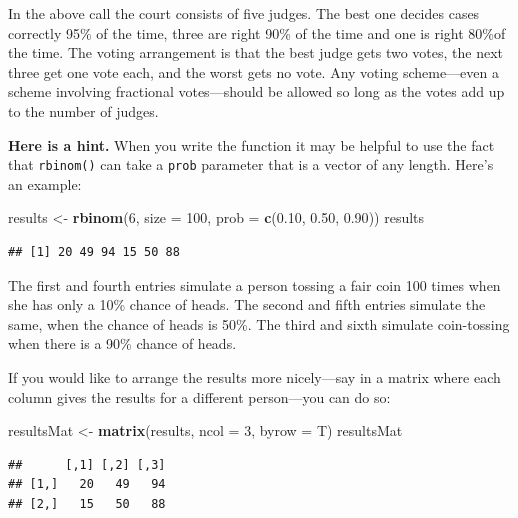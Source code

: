 \documentclass[]{book}
\makeatletter
\newenvironment{Shaded}{\begin{snugshade}}{\end{snugshade}}
\newcommand{\KeywordTok}[1]{\textcolor[rgb]{0.13,0.29,0.53}{\textbf{#1}}}
\newcommand{\DataTypeTok}[1]{\textcolor[rgb]{0.13,0.29,0.53}{#1}}
\newcommand{\DecValTok}[1]{\textcolor[rgb]{0.00,0.00,0.81}{#1}}
\newcommand{\FloatTok}[1]{\textcolor[rgb]{0.00,0.00,0.81}{#1}}
\newcommand{\StringTok}[1]{\textcolor[rgb]{0.31,0.60,0.02}{#1}}
\newcommand{\NormalTok}[1]{#1}
\newenvironment{kframe}{%
\medskip{}
\setlength{\fboxsep}{.8em}
 \def\at@end@of@kframe{}%
 \ifinner\ifhmode%
  \def\at@end@of@kframe{\end{minipage}}%
  \begin{minipage}{\columnwidth}%
 \fi\fi%
 \def\FrameCommand##1{\hskip\@totalleftmargin \hskip-\fboxsep
 \colorbox{shadecolor}{##1}\hskip-\fboxsep
     \hskip-\linewidth \hskip-\@totalleftmargin \hskip\columnwidth}%
 \MakeFramed {\advance\hsize-\width
   \@totalleftmargin\z@ \linewidth\hsize
   \@setminipage}}%
 {\par\unskip\endMakeFramed%
 \at@end@of@kframe}
\renewenvironment{Shaded}{\begin{kframe}}{\end{kframe}}
\theoremstyle{definition}
\theoremstyle{definition}
\theoremstyle{definition}
\theoremstyle{remark}
\makeatother
\begin{document}
{\begin{enumerate}
  In the above call the court consists of five judges. The best one
  decides cases correctly 95\% of the time, three are right 90\% of the
  time and one is right 80\%of the time. The voting arrangement is that
  the best judge gets two votes, the next three get one vote each, and
  the worst gets no vote. Any voting scheme---even a scheme involving
  fractional votes---should be allowed so long as the votes add up to
  the number of judges.

  \textbf{Here is a hint.} When you write the function it may be helpful
  to use the fact that \texttt{rbinom()} can take a \texttt{prob}
  parameter that is a vector of any length. Here's an example:

\begin{Shaded}
\begin{Highlighting}[]
\NormalTok{results <-}\StringTok{ }\KeywordTok{rbinom}\NormalTok{(}\DecValTok{6}\NormalTok{, }\DataTypeTok{size =} \DecValTok{100}\NormalTok{, }\DataTypeTok{prob =} \KeywordTok{c}\NormalTok{(}\FloatTok{0.10}\NormalTok{, }\FloatTok{0.50}\NormalTok{, }\FloatTok{0.90}\NormalTok{))}
\NormalTok{results}
\end{Highlighting}
\end{Shaded}

\begin{verbatim}
## [1] 20 49 94 15 50 88
\end{verbatim}

  The first and fourth entries simulate a person tossing a fair coin 100
  times when she has only a 10\% chance of heads. The second and fifth
  entries simulate the same, when the chance of heads is 50\%. The third
  and sixth simulate coin-tossing when there is a 90\% chance of heads.

  If you would like to arrange the results more nicely---say in a matrix
  where each column gives the results for a different person---you can
  do so:

\begin{Shaded}
\begin{Highlighting}[]
\NormalTok{resultsMat <-}\StringTok{ }\KeywordTok{matrix}\NormalTok{(results, }\DataTypeTok{ncol =} \DecValTok{3}\NormalTok{, }\DataTypeTok{byrow =}\NormalTok{ T)}
\NormalTok{resultsMat}
\end{Highlighting}
\end{Shaded}

\begin{verbatim}
##      [,1] [,2] [,3]
## [1,]   20   49   94
## [2,]   15   50   88
\end{verbatim}


\end{enumerate}}
\end{document}
